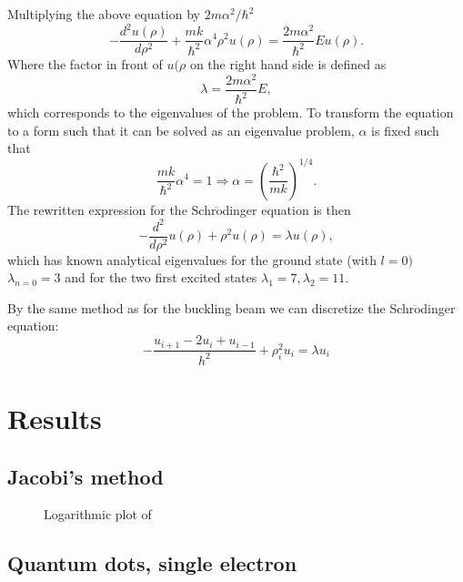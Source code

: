 \documentclass{emulateapj}
\begin{document}
%
Multiplying the above equation by $2m\alpha^2 / \hbar^2$
%
\begin{equation*}
    -\frac{d^2u(\rho)}{d\rho^2} + \frac{mk}{\hbar^2}\alpha^4 \rho^2u(\rho) = \frac{2m\alpha^2}{\hbar^2}Eu(\rho).
\end{equation*}
%
Where the factor in front of $u(\rho$ on the right hand side is defined as
%
\begin{equation*}
    \lambda = \frac{2m\alpha^2}{\hbar^2}E,
\end{equation*}
%
which corresponds to the eigenvalues of the problem. To transform the equation to a form such that it can be solved as an eigenvalue problem, $\alpha$ is fixed such that
%
\begin{equation*}
    \frac{mk}{\hbar^2}\alpha^4 = 1
    \Rightarrow \alpha = \left(\frac{\hbar^2}{mk}\right)^{1/4}.
\end{equation*}
%
The rewritten expression for the Schr$\ddot{\mathrm{o}}$dinger equation is then
%
\begin{equation*}
    -\frac{d^2}{d\rho^2}u(\rho) + \rho^2u(\rho) = \lambda u(\rho),
\end{equation*}
%
which has known analytical eigenvalues for the ground state (with $l=0)$ $\lambda_{n=0} = 3$ and for the two first excited states $\lambda_1 = 7, \lambda_2 = 11$. 

By the same method as for the buckling beam we can discretize the Schr$\ddot{\mathrm{o}}$dinger equation:
%
\begin{equation*}
    -\frac{u_{i+1} - 2u_i + u_{i-1}}{h^2} + \rho_i^2u_i = \lambda u_i
\end{equation*}



\section{Results}
\label{sec:results}

\subsection{Jacobi's method}

\begin{figure}[t]
\mbox{}
\caption{Logarithmic plot of }
\label{fig:fig1}
\end{figure}

\subsection{Quantum dots, single electron}
\end{document}

